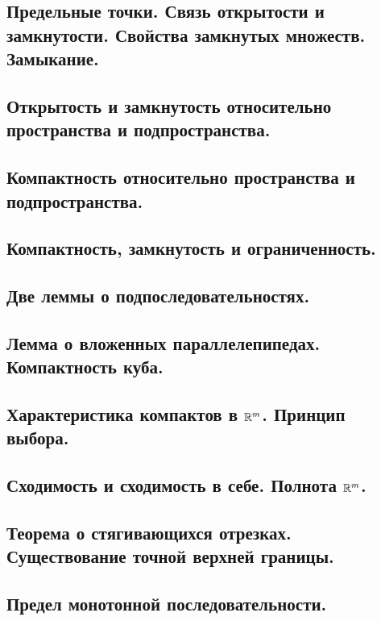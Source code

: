 \documentclass[12pt, a4paper]{article}
\begin{document}
\subsection{Предельные точки. Связь открытости и замкнутости. Свойства замкнутых множеств. Замыкание.}

\subsection{Открытость и замкнутость относительно пространства и подпространства.}

\subsection{Компактность относительно пространства и подпространства.}

\subsection{Компактность, замкнутость и ограниченность.}

\subsection{Две леммы о подпоследовательностях.}

\subsection{Лемма о вложенных параллелепипедах. Компактность куба.}

\subsection{Характеристика компактов в ${\mathbb{R}}^m$. Принцип выбора.}

\subsection{Сходимость и сходимость в себе. Полнота ${\mathbb{R}}^m$.}

\subsection{Теорема о стягивающихся отрезках. Существование точной верхней границы.}

\subsection{Предел монотонной последовательности.}
\end{document}
